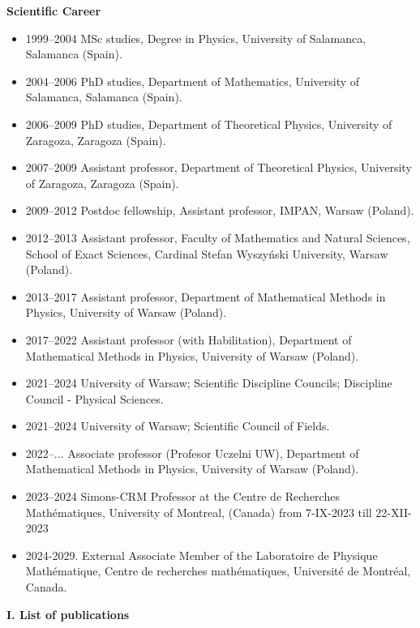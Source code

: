 \documentclass[12pt,reqno]{amsbook}
\begin{document}
                {\Large \textbf {Scientific Career}}
\vspace {1cm}
\begin {itemize}
\item [1999--2004] MSc studies, Degree in Physics, University of Salamanca, Salamanca (Spain).
\item [2004--2006] PhD studies, Department of Mathematics, University of Salamanca, Salamanca (Spain).
\item [2006--2009] PhD studies,  Department of Theoretical Physics, University of Zaragoza, Zaragoza (Spain).
\item[2007--2009] Assistant professor, Department of Theoretical Physics, University of Zaragoza, Zaragoza (Spain).
\item [2009--2012] Postdoc fellowship, Assistant professor, IMPAN, Warsaw (Poland).
\item[2012--2013] Assistant professor, Faculty of Mathematics and Natural Sciences, School of Exact Sciences, Cardinal Stefan Wyszy\'nski University, Warsaw (Poland).
\item[2013--2017] Assistant professor, Department of Mathematical Methods in Physics, University of Warsaw (Poland).
\item[2017--2022] Assistant professor (with Habilitation), Department of Mathematical Methods in Physics, University of Warsaw (Poland).
\item[2021--2024] University of Warsaw; Scientific Discipline Councils; Discipline Council - Physical Sciences.
\item[2021--2024] University of Warsaw; Scientific Council of Fields.
\item[2022--...] Associate professor (Profesor Uczelni UW), Department of Mathematical Methods in Physics, University of Warsaw (Poland).
\item[2023--2024] Simons-CRM Professor at the Centre de Recherches Math\'ematiques, University of Montreal, (Canada) from 7-IX-2023 till 22-XII-2023
  \item[2024-2029.]  External Associate Member of the Laboratoire de Physique Mathématique, 
	Centre de recherches mathématiques, 
Université de Montréal, Canada.

\end {itemize}
\setcounter{page}{2}



\color{blue}
{\bf \large I. List of publications}\color{black}
\end{document}

